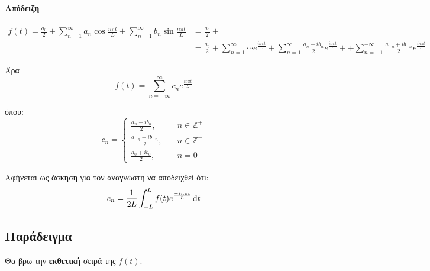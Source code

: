 \documentclass[11pt,a4paper,titlepage,draft]{article}
\begin{document}
\paragraph{Απόδειξη}
\begin{align*}
f(t) = \frac{a_0}{2}+\sum_{n=1}^\infty a_n \cos \frac{n\pi t}{L}
+\sum_{n=1}^\infty b_n \sin \frac{n\pi t}{L} &=
\frac{a_0}{2} +
\\ &=
\frac{a_0}{2}
+ \sum_{n=1}^\infty \cdots e^{\frac{in\pi t}{L}}
+ \sum_{n=1}^\infty \frac{a_n-ib_n}{2}
e^{\frac{in\pi t}{L}} +
+ \sum_{n=-1}^{-\infty} \frac{a_{-n}+ib_{-n}}{2}
e^{\frac{in\pi t}{L}}
\end{align*}

Άρα \[
f(t) = \sum_{n=-\infty}^\infty c_n e^{\frac{in\pi t}{L}}
\]

όπου: \[
c_n = \begin{cases}
\frac{a_n-ib_n}{2},\quad & n \in \mathbb Z^+ \\
\frac{a_{-n}+ib_{-n}}{2},\quad & n \in \mathbb Z^- \\
\frac{a_0+ib_0}{2},\quad & n=0
\end{cases}
\]

Αφήνεται ως άσκηση για τον αναγνώστη να αποδειχθεί ότι:
\[
c_n =
\frac{1}{2L}
\int_{-L}^L f(t) e^{\frac{-in\pi t}{L}} \dif t
\]

\subsection{Παράδειγμα}
\begin{center}
\end{center}

Θα βρω την \textbf{εκθετική} σειρά της \(f(t)\).
\end{document}
